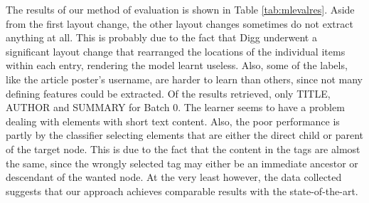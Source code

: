 	The results of our method of evaluation is shown in Table \ref{tab:mlevalres}.
Aside from the first layout change, the other layout changes sometimes do not extract anything
at all. This is probably due to the fact that Digg underwent a significant layout change that
rearranged the locations of the individual items within each entry, rendering the model learnt
useless. Also, some of the labels, like the article poster's username, are harder to learn
than others, since not many defining features could be extracted. Of the results retrieved,
only TITLE, AUTHOR and SUMMARY for Batch 0. The learner seems to have a problem dealing with
elements with short text content. Also, the poor performance is partly by 
the classifier selecting elements that are either the direct child or parent of the target node.
This is due to the fact that the content in the tags are almost the same, since the wrongly
selected tag may either be an immediate ancestor or descendant of the wanted node. 
At the very least however, the data collected suggests that our approach achieves comparable
results with the state-of-the-art.